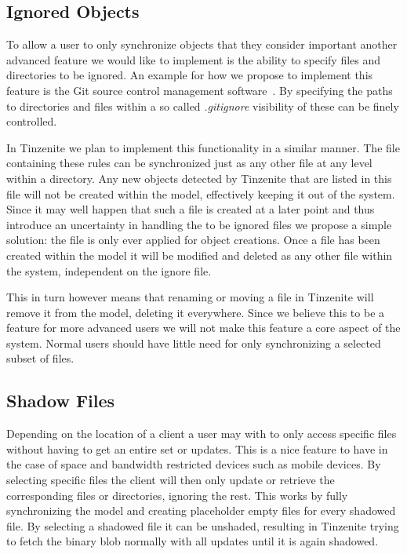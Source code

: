 \subsection{Ignored Objects}
\label{sub:Ignored Objects}

To allow a user to only synchronize objects that they consider important another advanced feature we would like to implement is the ability to specify files and directories to be ignored.
An example for how we propose to implement this feature is the Git source control management software~\cite{web:site:git}.
By specifying the paths to directories and files within a so called \textit{.gitignore} visibility of these can be finely controlled.

In Tinzenite we plan to implement this functionality in a similar manner.
The file containing these rules can be synchronized just as any other file at any level within a directory.
Any new objects detected by Tinzenite that are listed in this file will not be created within the model, effectively keeping it out of the system.
Since it may well happen that such a file is created at a later point and thus introduce an uncertainty in handling the to be ignored files we propose a simple solution: the file is only ever applied for object creations.
Once a file has been created within the model it will be modified and deleted as any other file within the system, independent on the ignore file.

This in turn however means that renaming or moving a file in Tinzenite will remove it from the model, deleting it everywhere.
Since we believe this to be a feature for more advanced users we will not make this feature a core aspect of the system.
Normal users should have little need for only synchronizing a selected subset of files.

\subsection{Shadow Files}
\label{sub:Shadow Files}

Depending on the location of a client a user may with to only access specific files without having to get an entire set or updates.
This is a nice feature to have in the case of space and bandwidth restricted devices such as mobile devices.
By selecting specific files the client will then only update or retrieve the corresponding files or directories, ignoring the rest.
This works by fully synchronizing the model and creating placeholder empty files for every shadowed file.
By selecting a shadowed file it can be unshaded, resulting in Tinzenite trying to fetch the binary blob normally with all updates until it is again shadowed.

